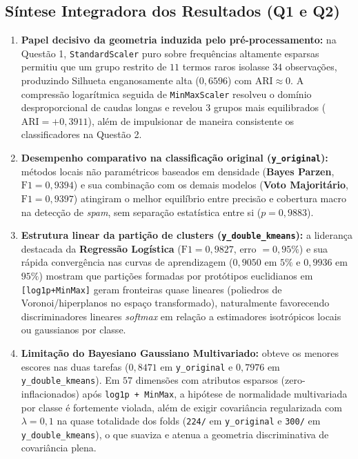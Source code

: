 \documentclass[a4paper,11pt]{article}
\begin{document}
\subsection{Síntese Integradora dos Resultados (Q1 e Q2)}\label{sec:3-1-sintese-integradora-dos-resultados-q1-e-q2}


\begin{enumerate}[leftmargin=1.5em, itemsep=0.25em, topsep=0.25em]
  \item \textbf{Papel decisivo da geometria induzida pelo pré-processamento:} na Questão 1, \texttt{StandardScaler} puro sobre frequências altamente esparsas permitiu que um grupo restrito de $11$ termos raros isolasse $34$ observações, produzindo Silhueta enganosamente alta ($0,6596$) com $\text{ARI} \approx 0$. A compressão logarítmica seguida de \texttt{MinMaxScaler} resolveu o domínio desproporcional de caudas longas e revelou $3$ grupos mais equilibrados ($\text{ARI} = +0,3911$), além de impulsionar de maneira consistente os classificadores na Questão 2.
  \item \textbf{Desempenho comparativo na classificação original (\texttt{y\_\allowbreak original}):} métodos locais não paramétricos baseados em densidade (\textbf{Bayes Parzen}, $\text{F1} = 0,9394$) e sua combinação com os demais modelos (\textbf{Voto Majoritário}, $\text{F1} = 0,9397$) atingiram o melhor equilíbrio entre precisão e cobertura macro na detecção de \textit{spam}, sem separação estatística entre si ($p = 0,9883$).
  \item \textbf{Estrutura linear da partição de clusters (\texttt{y\_\allowbreak double\_\allowbreak kmeans}):} a liderança destacada da \textbf{Regressão Logística} ($\text{F1} = 0,9827$, erro $= 0,95\%$) e sua rápida convergência nas curvas de aprendizagem ($0,9050$ em $5\%$ e $0,9936$ em $95\%$) mostram que partições formadas por protótipos euclidianos em \texttt{[log1p+MinMax]} geram fronteiras quase lineares (poliedros de Voronoi/hiperplanos no espaço transformado), naturalmente favorecendo discriminadores lineares \textit{softmax} em relação a estimadores isotrópicos locais ou gaussianos por classe.
  \item \textbf{Limitação do Bayesiano Gaussiano Multivariado:} obteve os menores escores nas duas tarefas ($0,8471$ em \texttt{y\_\allowbreak original} e $0,7976$ em \texttt{y\_\allowbreak double\_\allowbreak kmeans}). Em $57$ dimensões com atributos esparsos (zero-inflacionados) após \texttt{log1p + MinMax}, a hipótese de normalidade multivariada por classe é fortemente violada, além de exigir covariância regularizada com $\lambda = 0,1$ na quase totalidade dos folds (\texttt{224/} em \texttt{y\_\allowbreak original} e \texttt{300/} em \texttt{y\_\allowbreak double\_\allowbreak kmeans}), o que suaviza e atenua a geometria discriminativa de covariância plena.
\end{enumerate}
\end{document}
